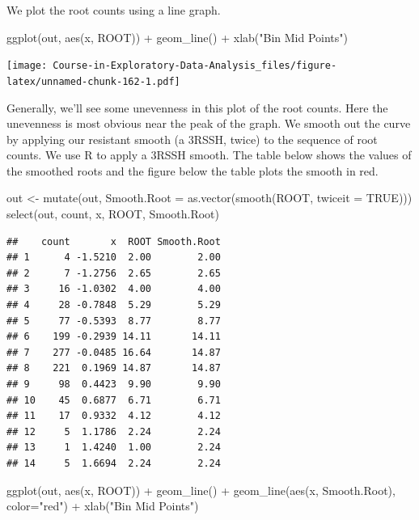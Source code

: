 \documentclass[
]{book}
\newenvironment{Shaded}{\begin{snugshade}}{\end{snugshade}}
\newcommand{\AttributeTok}[1]{\textcolor[rgb]{0.77,0.63,0.00}{#1}}
\newcommand{\ConstantTok}[1]{\textcolor[rgb]{0.00,0.00,0.00}{#1}}
\newcommand{\FunctionTok}[1]{\textcolor[rgb]{0.00,0.00,0.00}{#1}}
\newcommand{\NormalTok}[1]{#1}
\newcommand{\OtherTok}[1]{\textcolor[rgb]{0.56,0.35,0.01}{#1}}
\newcommand{\SpecialCharTok}[1]{\textcolor[rgb]{0.00,0.00,0.00}{#1}}
\newcommand{\StringTok}[1]{\textcolor[rgb]{0.31,0.60,0.02}{#1}}
\begin{document}
We plot the root counts using a line graph.

\begin{Shaded}
\begin{Highlighting}[]
\FunctionTok{ggplot}\NormalTok{(out, }\FunctionTok{aes}\NormalTok{(x, ROOT)) }\SpecialCharTok{+}
  \FunctionTok{geom\_line}\NormalTok{() }\SpecialCharTok{+}
  \FunctionTok{xlab}\NormalTok{(}\StringTok{"Bin Mid Points"}\NormalTok{)}
\end{Highlighting}
\end{Shaded}

\texttt{[image: Course-in-Exploratory-Data-Analysis\_files/figure-latex/unnamed-chunk-162-1.pdf]}

Generally, we'll see some unevenness in this plot of the root counts. Here the unevenness is most obvious near the peak of the graph. We smooth out the curve by applying our resistant smooth (a 3RSSH, twice) to the sequence of root counts. We use R to apply a 3RSSH smooth. The table below shows the values of the smoothed roots and the figure below the table plots the smooth in red.

\begin{Shaded}
\begin{Highlighting}[]
\NormalTok{out }\OtherTok{\textless{}{-}} \FunctionTok{mutate}\NormalTok{(out,}
  \AttributeTok{Smooth.Root =} \FunctionTok{as.vector}\NormalTok{(}\FunctionTok{smooth}\NormalTok{(ROOT, }\AttributeTok{twiceit =} \ConstantTok{TRUE}\NormalTok{)))}
\FunctionTok{select}\NormalTok{(out, count, x, ROOT, Smooth.Root)}
\end{Highlighting}
\end{Shaded}

\begin{verbatim}
##    count       x  ROOT Smooth.Root
## 1      4 -1.5210  2.00        2.00
## 2      7 -1.2756  2.65        2.65
## 3     16 -1.0302  4.00        4.00
## 4     28 -0.7848  5.29        5.29
## 5     77 -0.5393  8.77        8.77
## 6    199 -0.2939 14.11       14.11
## 7    277 -0.0485 16.64       14.87
## 8    221  0.1969 14.87       14.87
## 9     98  0.4423  9.90        9.90
## 10    45  0.6877  6.71        6.71
## 11    17  0.9332  4.12        4.12
## 12     5  1.1786  2.24        2.24
## 13     1  1.4240  1.00        2.24
## 14     5  1.6694  2.24        2.24
\end{verbatim}

\begin{Shaded}
\begin{Highlighting}[]
\FunctionTok{ggplot}\NormalTok{(out, }\FunctionTok{aes}\NormalTok{(x, ROOT)) }\SpecialCharTok{+}
  \FunctionTok{geom\_line}\NormalTok{() }\SpecialCharTok{+}
  \FunctionTok{geom\_line}\NormalTok{(}\FunctionTok{aes}\NormalTok{(x, Smooth.Root), }\AttributeTok{color=}\StringTok{"red"}\NormalTok{) }\SpecialCharTok{+}
  \FunctionTok{xlab}\NormalTok{(}\StringTok{"Bin Mid Points"}\NormalTok{)}
\end{Highlighting}
\end{Shaded}
\end{document}
